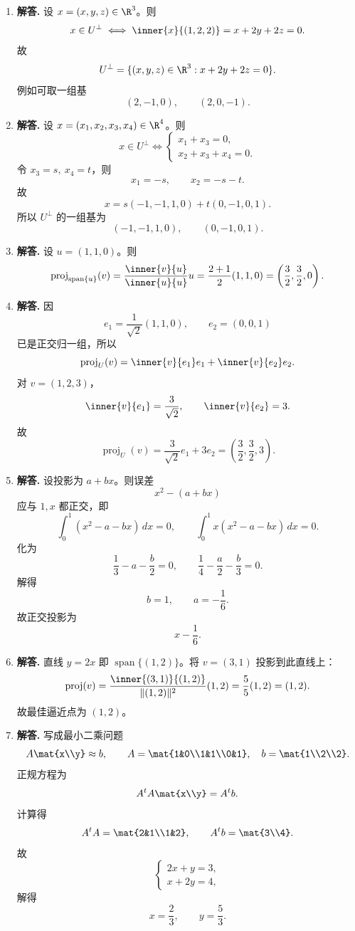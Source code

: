 \begin{enumerate}[label=\textbf{\arabic*.}, leftmargin=*, itemsep=1em]
\item \textbf{解答.} 设 $x=(x,y,z)\in\R^3$。则
\[
x\in U^\perp \iff \inner{x}{(1,2,2)}=x+2y+2z=0.
\]
故
\[
U^\perp=\{(x,y,z)\in\R^3:x+2y+2z=0\}.
\]
例如可取一组基
\[
(2,-1,0),\qquad (2,0,-1).
\]

\item \textbf{解答.} 设 $x=(x_1,x_2,x_3,x_4)\in\R^4$。则
\[
x\in U^\perp
\iff
\begin{cases}
x_1+x_3=0,\\
x_2+x_3+x_4=0.
\end{cases}
\]
令 $x_3=s,\ x_4=t$，则
\[
x_1=-s,\qquad x_2=-s-t.
\]
故
\[
x=s(-1,-1,1,0)+t(0,-1,0,1).
\]
所以 $U^\perp$ 的一组基为
\[
(-1,-1,1,0),\qquad (0,-1,0,1).
\]

\item \textbf{解答.} 设 $u=(1,1,0)$。则
\[
\operatorname{proj}_{\operatorname{span}\{u\}}(v)
=\frac{\inner{v}{u}}{\inner{u}{u}}u
=\frac{2+1}{2}(1,1,0)
=\left(\frac32,\frac32,0\right).
\]

\item \textbf{解答.} 因
\[
e_1=\frac1{\sqrt2}(1,1,0),\qquad e_2=(0,0,1)
\]
已是正交归一组，所以
\[
\operatorname{proj}_U(v)=\inner{v}{e_1}e_1+\inner{v}{e_2}e_2.
\]
对 $v=(1,2,3)$，
\[
\inner{v}{e_1}=\frac{3}{\sqrt2},\qquad \inner{v}{e_2}=3.
\]
故
\[
\operatorname{proj}_U(v)=\frac{3}{\sqrt2}e_1+3e_2
=\left(\frac32,\frac32,3\right).
\]

\item \textbf{解答.} 设投影为 $a+bx$。则误差
\[
x^2-(a+bx)
\]
应与 $1,x$ 都正交，即
\[
\int_0^1(x^2-a-bx)\,dx=0,\qquad
\int_0^1x(x^2-a-bx)\,dx=0.
\]
化为
\[
\frac13-a-\frac b2=0,\qquad \frac14-\frac a2-\frac b3=0.
\]
解得
\[
b=1,\qquad a=-\frac16.
\]
故正交投影为
\[
x-\frac16.
\]

\item \textbf{解答.} 直线 $y=2x$ 即 $\operatorname{span}\{(1,2)\}$。将 $v=(3,1)$ 投影到此直线上：
\[
\operatorname{proj}(v)=\frac{\inner{(3,1)}{(1,2)}}{\|(1,2)\|^2}(1,2)
=\frac{5}{5}(1,2)=(1,2).
\]
故最佳逼近点为 $(1,2)$。

\item \textbf{解答.} 写成最小二乘问题
\[
A\mat{x\\y}\approx b,\qquad
A=\mat{1&0\\1&1\\0&1},\quad
b=\mat{1\\2\\2}.
\]
正规方程为
\[
A^tA\mat{x\\y}=A^tb.
\]
计算得
\[
A^tA=\mat{2&1\\1&2},\qquad A^tb=\mat{3\\4}.
\]
故
\[
\begin{cases}
2x+y=3,\\
x+2y=4,
\end{cases}
\]
解得
\[
x=\frac23,\qquad y=\frac53.
\]


\end{enumerate}
